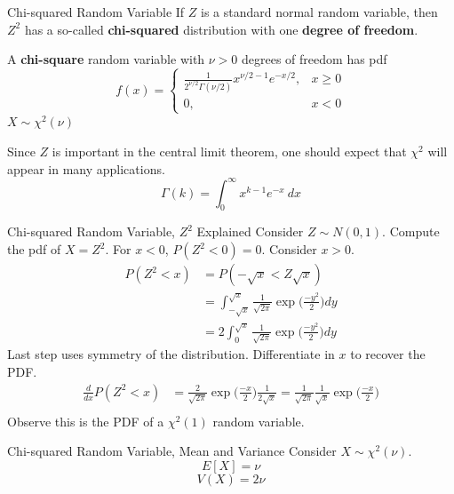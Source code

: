 \documentclass[handout]{beamer}
\begin{document}
\begin{frame}{Chi-squared Random Variable}
    If $Z$ is a standard normal random variable, then $Z^2$ has a so-called \textbf{chi-squared} distribution with one \textbf{degree of freedom}.

    \begin{block}{}
        A \textbf{chi-square} random variable with $\nu>0$ degrees of freedom has pdf
        $$f(x) = \begin{cases}\frac1{2^{\nu/2}\Gamma(\nu/2)}x^{\nu/2-1}e^{-x/2},& x\geq 0 \\ 0, & x<0\end{cases}$$
        $X \sim \chi^2(\nu)$
    \end{block}
    Since $Z$ is important in the central limit theorem, one should expect that $\chi^2$ will appear in many applications.
    $$\Gamma(k) = \int_0^\infty x^{k-1}e^{-x}\ dx$$
\end{frame}
\begin{frame}{Chi-squared Random Variable, $Z^2$ Explained}
    Consider $Z\sim N(0,1)$. Compute the pdf of $X= Z^2$.
    For $x<0$, $ P(Z^2<0)=0$.
    Consider $x>0$.
    \pause
    \begin{align*}
        P(Z^2<x) & = P(-\sqrt{x}<Z \sqrt{x})                                                             \\
                 & = \int_{-\sqrt{x}}^{\sqrt{x}} \frac{1}{\sqrt{2\pi}} \exp\bigg(\frac{-y^2}{2}\bigg) dy \\
                 & = 2 \int_{0}^{\sqrt{x}} \frac{1}{\sqrt{2\pi}} \exp\bigg(\frac{-y^2}{2}\bigg) dy
    \end{align*}
    \pause Last step uses symmetry of the distribution. Differentiate in $x$ to recover the PDF.
    \pause
    \begin{align*}
        \frac{d}{dx} P(Z^2 < x) & = \frac{2}{\sqrt{2\pi}}\exp\bigg(\frac{-x}{2}\bigg)\frac{1}{2\sqrt{x}} = \frac{1}{\sqrt{2\pi}}\frac{1}{\sqrt{x}}\exp\bigg(\frac{-x}{2}\bigg) \\
    \end{align*}
    Observe this is the PDF of a $\chi^2(1)$ random variable.
\end{frame}
\begin{frame}{Chi-squared Random Variable, Mean and Variance}
    Consider $X\sim \chi^2(\nu)$.
    $$E[X] = \nu$$
    $$ V(X) = 2\nu $$
    \vfill
\end{frame}
\end{document}
